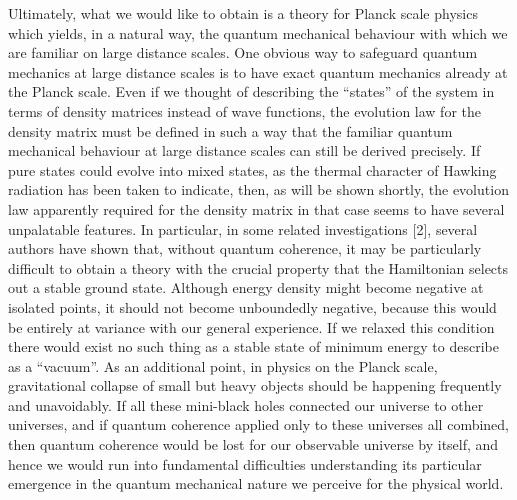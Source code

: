 Ultimately, what we would like to obtain is a theory for Planck scale
physics which yields, in a natural way, the quantum mechanical
behaviour with which we are familiar on large distance scales. One
obvious way to safeguard quantum mechanics at large distance scales is
to have exact quantum mechanics already at the Planck scale.  Even if
we thought of describing the ``states'' of the system in terms of
density matrices instead of wave functions, the evolution law for the
density matrix must be defined in such a way that the familiar quantum
mechanical behaviour at large distance scales can still be derived
precisely. If pure states could evolve into mixed states, as the
thermal character of Hawking radiation has been taken to indicate,
then, as will be shown shortly, the evolution law apparently required
for the density matrix in that case seems to have several unpalatable
features. In particular, in some related investigations [2], several
authors have shown that, without quantum coherence, it may be
particularly difficult to obtain a theory with the crucial property
that the Hamiltonian selects out a stable ground state.  Although
energy density might become negative at isolated points, it should not
become unboundedly negative, because this would be entirely at variance
with our general experience. If we relaxed this condition there would
exist no such thing as a stable  state of minimum energy to describe as
a ``vacuum''.  As an additional point, in physics on the Planck scale,
gravitational collapse of small but heavy objects should be happening
frequently and unavoidably. If all these mini-black holes connected our
universe to other universes, and if quantum coherence applied only to
these universes all combined, then quantum coherence would be lost for
our observable universe by itself, and hence we would run into
fundamental difficulties understanding its particular emergence in the
quantum mechanical nature we perceive for the physical world.

